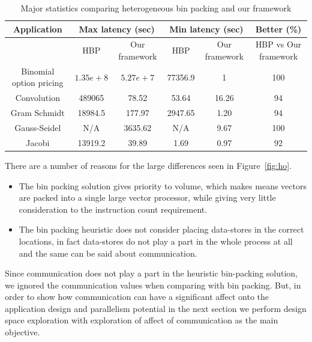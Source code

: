 \begin{table}[t!]
  \centering
  \begin{tabular}{|c|c|c|c|c|c|}
    \hline
    \textbf{Application} &
    \multicolumn{2}{|c|}{\textbf{Max latency (sec)}} &
    \multicolumn{2}{|c|}{\textbf{Min latency (sec)}} &
    \textbf{Better (\%)} \\
    \hline
    & {HBP} & {Our framework} &
    {HBP} & {Our framework} & HBP vs Our framework\\
    \hline
    Binomial option pricing & $1.35e+8$ & $5.27e+7$ & 77356.9 & 1 & 100 \\
    \hline
    Convolution & 489065 & 78.52 & 53.64 & 16.26 & 94\\
    \hline
    Gram Schmidt & 18984.5 & 177.97 & 2947.65 & 1.20 & 94\\
    \hline
    Gauss-Seidel & N/A & 3635.62 & N/A & 9.67 & 100\\
    \hline
    Jacobi & 13919.2 & 39.89 & 1.69 & 0.97 & 92\\
    \hline
  \end{tabular}
  \caption{Major statistics comparing heterogeneous bin packing and our framework}
  \label{tab:2}
\end{table}

There are a number of reasons for the large differences seen in
Figure~\ref{fig:ho}.

\begin{itemize}

\item The bin packing solution gives priority to volume, which makes
  means vectors are packed into a single large vector processor, while
  giving very little consideration to the instruction count requirement.

\item The bin packing heuristic does not consider placing data-stores in
  the correct locations, in fact data-stores do not play a part in the
  whole process at all and the same can be said about communication.

\end{itemize}

Since communication does not play a part in the heuristic bin-packing
solution, we ignored the communication values when comparing with bin
packing. But, in order to show how communication can have a significant
affect onto the application design and parallelism potential in the next
section we perform design space exploration with exploration of affect
of communication as the main objective.

